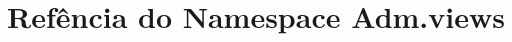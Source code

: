 \hypertarget{namespaceAdm_1_1views}{\section{Refência do Namespace Adm.\-views}
\label{d4/d4f/namespaceAdm_1_1views}
}
